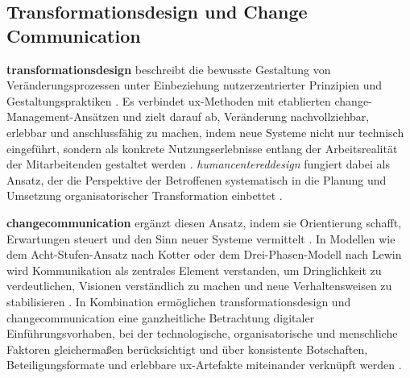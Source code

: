 \subsection{Transformationsdesign und Change Communication}
\label{subsec:02-04-02_change-communication}

\textbf{\Gls{transformationsdesign}} beschreibt die bewusste Gestaltung von Veränderungsprozessen unter Einbeziehung nutzerzentrierter Prinzipien und Gestaltungspraktiken \cite{417:Benyon2019,408:Hassenzahl2010}. Es verbindet \Gls{ux}-Methoden mit etablierten \Gls{change}-Management-Ansätzen und zielt darauf ab, Veränderung nachvollziehbar, erlebbar und anschlussfähig zu machen, indem neue Systeme nicht nur technisch eingeführt, sondern als konkrete Nutzungserlebnisse entlang der Arbeitsrealität der Mitarbeitenden gestaltet werden \cite{403:Westerman2014,110:Lewin1947}. \textit{\Gls{humancentereddesign}} fungiert dabei als Ansatz, der die Perspektive der Betroffenen systematisch in die Planung und Umsetzung organisatorischer Transformation einbettet \cite{109:Liedtka2018,500:ISO9241-210}.

\textbf{\Gls{changecommunication}} ergänzt diesen Ansatz, indem sie Orientierung schafft, Erwartungen steuert und den Sinn neuer Systeme vermittelt \cite{418:Kotter2012,110:Lewin1947}. In Modellen wie dem Acht-Stufen-Ansatz nach Kotter oder dem Drei-Phasen-Modell nach Lewin wird Kommunikation als zentrales Element verstanden, um Dringlichkeit zu verdeutlichen, Visionen verständlich zu machen und neue Verhaltensweisen zu stabilisieren \cite{418:Kotter2012,110:Lewin1947}. In Kombination ermöglichen \Gls{transformationsdesign} und \Gls{changecommunication} eine ganzheitliche Betrachtung digitaler Einführungsvorhaben, bei der technologische, organisatorische und menschliche Faktoren gleichermaßen berücksichtigt und über konsistente Botschaften, Beteiligungsformate und erlebbare \Gls{ux}-Artefakte miteinander verknüpft werden \cite{417:Benyon2019,403:Westerman2014}.
